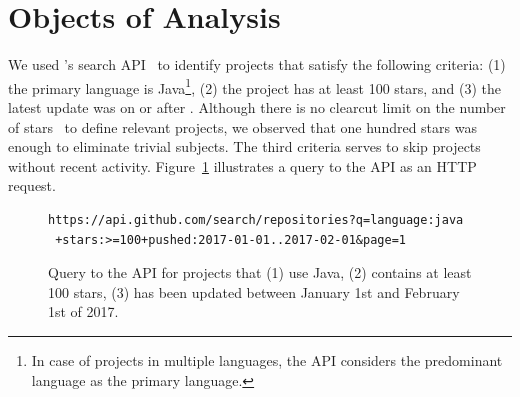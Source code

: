 \section{Objects of Analysis}
\label{sec:subjects}

We used \github{}'s search API~\cite{githubsearch} to identify
projects that satisfy the following criteria: (1) the primary language
is Java\footnote{In case of projects in multiple languages, the
  \github{} API considers the predominant language as the primary
  language.}, (2) the project has at least 100 stars, and (3) the latest
update was on or after .
Although there is no clearcut limit on the number of \github{}
stars~\cite{github-stars} to define relevant projects, we observed that one
hundred stars was enough to eliminate trivial subjects.
The third criteria serves to skip projects without recent activity.
Figure~\ref{fig:subject-query} illustrates a query to the \github{} API as
an HTTP request.

\begin{figure}[t!]
\centering
\tiny
{}
\begin{lstlisting}
https://api.github.com/search/repositories?q=language:java
 +stars:>=100+pushed:2017-01-01..2017-02-01&page=1
\end{lstlisting}
  \vspace{-3mm}
  \caption{\label{fig:subject-query} Query to the \github{} API for projects
  that (1) use Java, (2) contains at least 100 stars, (3) has been updated
  between January 1st and February 1st of 2017.}
  \vspace{-5mm}
\end{figure}

